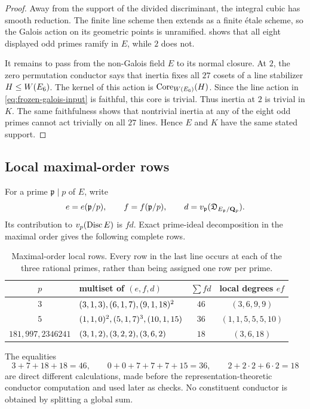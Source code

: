 \begin{proof}
Away from the support of the divided discriminant, the integral cubic has
smooth reduction.  The finite line scheme then extends as a finite étale
scheme, so the Galois action on its geometric points is unramified.
 shows that all eight displayed odd
primes ramify in $E$, while $2$ does not.

It remains to pass from the non-Galois field $E$ to its normal closure.  At
$2$, the zero permutation conductor says that inertia fixes all $27$ cosets
of a line stabilizer $H\leq W(E_6)$.  The kernel of this action is
$\operatorname{Core}_{W(E_6)}(H)$.  Since the line action in
\cref{eq:frozen-galois-input} is faithful, this core is trivial.  Thus
inertia at $2$ is trivial in $K$.  The same faithfulness shows that
nontrivial inertia at any of the eight odd primes cannot act trivially on all
$27$ lines.  Hence $E$ and $K$ have the same stated support.
\end{proof}

\subsection{Local maximal-order rows}

For a prime $\mathfrak p\mid p$ of $E$, write
\[
 e=e(\mathfrak p/p),\qquad f=f(\mathfrak p/p),\qquad
 d=v_{\mathfrak p}(\mathfrak D_{E_{\mathfrak p}/\mathbf{Q}_p}).
\]
Its contribution to $v_p(\operatorname{Disc} E)$ is $fd$.  Exact prime-ideal decomposition
in the maximal order gives the following complete rows.

\begin{table}[ht]
\centering
\caption{Maximal-order local rows.  Every row in the last line occurs at
each of the three rational primes, rather than being assigned one row per
prime.}
\label{tab:local-rows}
\begin{tabular}{@{}c l c c@{}}
\toprule
$p$&multiset of $(e,f,d)$&$\sum fd$&local degrees $ef$\\
\midrule
$3$&$(3,1,3),(6,1,7),(9,1,18)^2$&
$46$&$(3,6,9,9)$\\
$5$&$(1,1,0)^2,(5,1,7)^3,(10,1,15)$&
$36$&$(1,1,5,5,5,10)$\\
$181,997,2346241$&
$(3,1,2),(3,2,2),(3,6,2)$&
$18$&$(3,6,18)$\\
\bottomrule
\end{tabular}
\end{table}

The equalities
\[
3+7+18+18=46,\qquad 0+0+7+7+7+15=36,\qquad
2+2\cdot2+6\cdot2=18
\]
are direct different calculations, made before the representation-theoretic
conductor computation and used later as checks.  No constituent conductor is
obtained by splitting a global sum.

